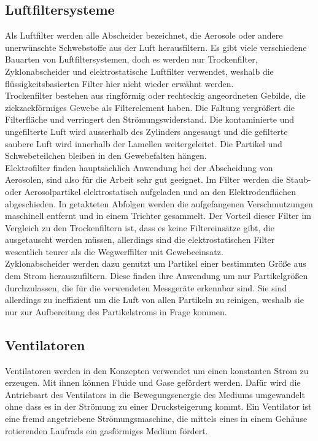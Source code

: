\subsection{Luftfiltersysteme}
Als Luftfilter werden alle Abscheider bezeichnet, die Aerosole oder andere unerwünschte Schwebstoffe aus der Luft herausfiltern. Es gibt viele verschiedene Bauarten von Luftfiltersystemen, doch es werden nur Trockenfilter, Zyklonabscheider und elektrostatische Luftfilter verwendet, weshalb die flüssigkeitsbasierten Filter hier nicht wieder erwähnt werden. \\
Trockenfilter bestehen aus ringförmig oder rechteckig angeordneten Gebilde, die zickzackförmiges Gewebe als Filterelement haben. Die Faltung vergrößert die Filterfläche und verringert den Strömungswiderstand. Die kontaminierte und ungefilterte Luft wird ausserhalb des Zylinders angesaugt und die gefilterte saubere Luft wird innerhalb der Lamellen weitergeleitet. Die Partikel und Schwebeteilchen bleiben in den Gewebefalten hängen.\\
Elektrofilter finden hauptsächlich Anwendung bei der Abscheidung von Aerosolen, sind also für die Arbeit sehr gut geeignet. Im Filter werden die Staub- oder Aerosolpartikel elektrostatisch aufgeladen und an den Elektrodenflächen abgeschieden. In getakteten Abfolgen werden die aufgefangenen Verschmutzungen maschinell entfernt und in einem Trichter gesammelt. Der Vorteil dieser Filter im Vergleich zu den Trockenfiltern ist, dass es keine Filtereinsätze gibt, die ausgetauscht werden müssen, allerdings sind die elektrostatischen Filter wesentlich teurer als die Wegwerffilter mit Gewebeeinsatz.\\
Zyklonabscheider werden dazu genutzt um Partikel einer bestimmten Größe aus dem Strom herauszufiltern. Diese finden ihre Anwendung um nur Partikelgrößen durchzulassen, die für die verwendeten Messgeräte erkennbar sind. Sie sind allerdings zu ineffizient um die Luft von allen Partikeln zu reinigen, weshalb sie nur zur Aufbereitung des Partikelstroms in Frage kommen.

\subsection{Ventilatoren}
Ventilatoren werden in den Konzepten verwendet um einen konstanten Strom zu erzeugen. Mit ihnen können Fluide und Gase gefördert werden. Dafür wird die Antriebsart des Ventilators in die Bewegungsenergie des Mediums umgewandelt ohne dass es in der Strömung zu einer Drucksteigerung kommt. Ein Ventilator ist eine fremd angetriebene Strömungsmaschine, die mittels eines in einem Gehäuse rotierenden Laufrads ein gasförmiges Medium fördert. 